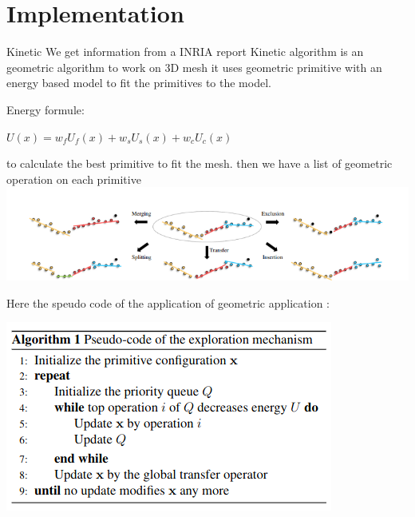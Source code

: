 \documentclass[10pt]{beamer}
\begin{document}
\section{Implementation}
\begin{frame}{Kinetic}
We get information from a INRIA report \cite{yu:hal-03621896}
Kinetic algorithm is an geometric algorithm to work on 3D mesh it uses  geometric primitive with an energy based model to fit the primitives to the model.

Energy formule: 
\newline
\begin{center}
    $        U(x) = w_f U_f(x) + w_s U_s(x) + w_c U_c(x)       $
\end{center}

to calculate the best primitive to fit the mesh.
then we have a list of geometric operation on each primitive
\includegraphics[scale=0.5]{../../images/geometric_operation.png}
\end{frame}
\begin{frame}
    
    Here the speudo code of the application of geometric application : 
    
    \begin{center}
        \includegraphics[scale =  0.5]{../../images/Pseudo_code_exploration.png}
      \end{center} 
\end{frame}
\end{document}
